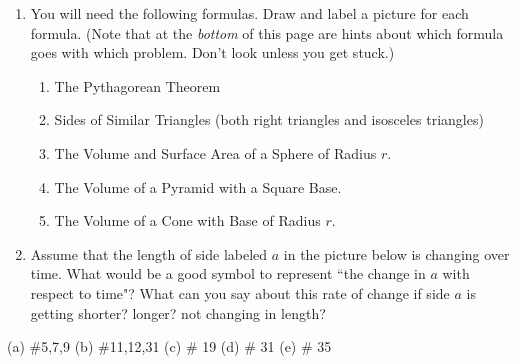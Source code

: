 \documentclass[11pt,fleqn]{article}
\begin{document}
 \begin{enumerate}
 \item You will need the following formulas. Draw and label a picture for each formula. (Note that at the \emph{bottom} of this page are hints about which formula goes with which problem. Don't look unless you get stuck.)
 	\begin{enumerate}
	\item The Pythagorean Theorem
	\vfill
	\item Sides of Similar Triangles (both right triangles and isosceles triangles)
	\vfill
	\item The Volume and Surface Area of a Sphere of Radius $r.$
	\vfill
	\item The Volume of a Pyramid with a Square Base.
	\vfill
	\item The Volume of a Cone with Base of Radius $r.$
	\vfill
	\end{enumerate}
\item Assume that the length of side labeled $a$ in the picture below is changing over time. What would be a good symbol to represent ``the change in $a$ with respect to time"? What can you say about this rate of change if side $a$ is getting shorter? longer? not changing in length?\\
 \end{enumerate}
 
 (a) \#5,7,9 (b) \#11,12,31 (c) \# 19 (d) \# 31 (e) \# 35
\end{document}
